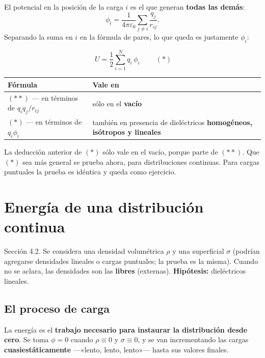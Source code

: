 \documentclass[12pt,a4paper]{article}
\begin{document}
El potencial en la posición de la carga $i$ es el que generan \textbf{todas las
demás}:
\[
\phi_i = \frac{1}{4\pi\varepsilon_0}\sum_{j\neq i}\frac{q_j}{r_{ij}} .
\]
Separando la suma en $i$ en la fórmula de pares, lo que queda es justamente
$\phi_i$:

\begin{keybox}
\[
\boxed{\ U = \frac{1}{2}\sum_{i=1}^{N} q_i\,\phi_i\ }\qquad(\ast)
\]
\end{keybox}

\begin{table}[H]
  \centering
  \begin{tabularx}{\textwidth}{lX}
    \toprule
    Fórmula & Vale en \\
    \midrule
    $(\ast\ast)$ --- en términos de $q_iq_j/r_{ij}$ & sólo en el \textbf{vacío} \\
    $(\ast)$ --- en términos de $q_i\phi_i$ & también en presencia de dieléctricos \textbf{homogéneos, isótropos y lineales} \\
    \bottomrule
  \end{tabularx}
\end{table}

\begin{notebox}
La deducción anterior de $(\ast)$ sólo vale en el vacío, porque parte de
$(\ast\ast)$. Que $(\ast)$ sea más general se prueba ahora, para distribuciones
continuas. Para cargas puntuales la prueba es idéntica y queda como ejercicio.
\end{notebox}

\section{Energía de una distribución continua}

Sección 4.2. Se considera una densidad volumétrica $\rho$ y una superficial
$\sigma$ (podrían agregarse densidades lineales o cargas puntuales; la prueba es
la misma). Cuando no se aclara, las densidades son las \textbf{libres}
(externas). \textbf{Hipótesis:} dieléctricos lineales.

\subsection{El proceso de carga}

La energía es el \textbf{trabajo necesario para instaurar la distribución desde
cero}. Se toma $\phi=0$ cuando $\rho\equiv 0$ y $\sigma\equiv 0$, y se van
incrementando las cargas \textbf{cuasiestáticamente} ---«lento, lento, lento»---
hasta sus valores finales.
\end{document}
